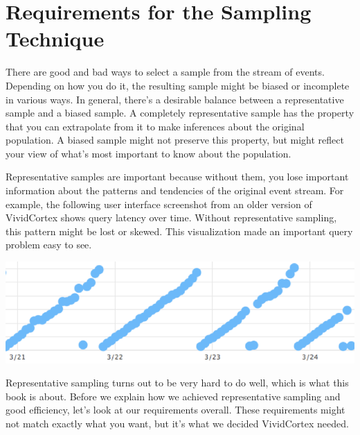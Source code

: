 \documentclass{vivid_layout}
\begin{document}
\section{Requirements for the Sampling Technique}

There are good and bad ways to select a sample from the stream of events.
Depending on how you do it, the resulting sample might be biased or incomplete
in various ways. In general, there's a desirable balance between a
representative sample and a biased sample. A completely representative sample
has the property that you can extrapolate from it to make inferences about the
original population. A biased sample might not preserve this property, but might
reflect your view of what's most important to know about the population.

Representative samples are important because without them, you lose important
information about the patterns and tendencies of the original event stream. For
example, the following user interface screenshot from an older version of
VividCortex shows query latency over time. Without representative sampling, this
pattern might be lost or skewed. This visualization made an important query
problem easy to see.

\begin{center}
\includegraphics[width=.85\linewidth]{sketch-sampling/latency-over-time}
\end{center}

Representative sampling turns out to be very hard to do well, which is what this
book is about. Before we explain how we achieved representative sampling
and good efficiency, let's look at our requirements overall. These requirements
might not match exactly what you want, but it's what we decided VividCortex
needed.
\end{document}
